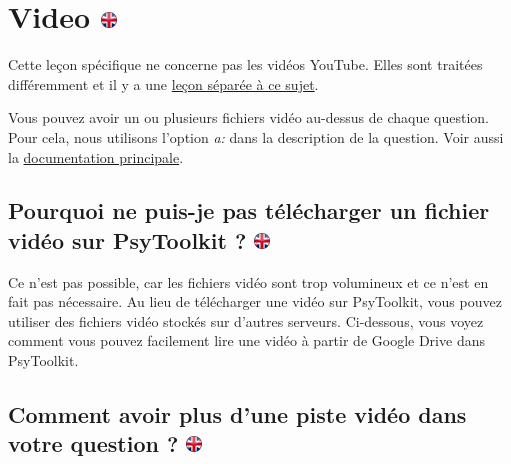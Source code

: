 \documentclass[
]{book}
\begin{document}
\hypertarget{video}{%
\section[Video ]{\texorpdfstring{Video
\href{https://www.psytoolkit.org/lessons/surveyaudiovideo.html\#_video}{\protect\includegraphics{img/ukflag.png}}}{Video }}\label{video}}

Cette leçon spécifique ne concerne pas les vidéos YouTube. Elles sont
traitées différemment et il y a une
\href{https://www.psytoolkit.org/lessons/youtube_video.html}{leçon
séparée à ce sujet}.

Vous pouvez avoir un ou plusieurs fichiers vidéo au-dessus de chaque
question. Pour cela, nous utilisons l'option \emph{a:} dans la
description de la question. Voir aussi la
\protect\hyperlink{s8}{documentation principale}.

\hypertarget{pourquoi-ne-puis-je-pas-tuxe9luxe9charger-un-fichier-viduxe9o-sur-psytoolkit}{%
\subsection[Pourquoi ne puis-je pas télécharger un fichier vidéo sur
PsyToolkit ? ]{\texorpdfstring{Pourquoi ne puis-je pas télécharger un
fichier vidéo sur PsyToolkit ?
\href{https://www.psytoolkit.org/lessons/surveyaudiovideo.html\#_why_can_i_not_upload_a_video_file_to_psytoolkit}{\protect\includegraphics{img/ukflag.png}}}{Pourquoi ne puis-je pas télécharger un fichier vidéo sur PsyToolkit ? }}\label{pourquoi-ne-puis-je-pas-tuxe9luxe9charger-un-fichier-viduxe9o-sur-psytoolkit}}

Ce n'est pas possible, car les fichiers vidéo sont trop volumineux et ce
n'est en fait pas nécessaire. Au lieu de télécharger une vidéo sur
PsyToolkit, vous pouvez utiliser des fichiers vidéo stockés sur d'autres
serveurs. Ci-dessous, vous voyez comment vous pouvez facilement lire une
vidéo à partir de Google Drive dans PsyToolkit.

\hypertarget{comment-avoir-plus-dune-piste-viduxe9o-dans-votre-question}{%
\subsection[Comment avoir plus d'une piste vidéo dans votre question ?
]{\texorpdfstring{Comment avoir plus d'une piste vidéo dans votre
question ?
\href{https://www.psytoolkit.org/lessons/surveyaudiovideo.html\#_how_to_have_more_than_one_audio_track_in_your_question}{\protect\includegraphics{img/ukflag.png}}}{Comment avoir plus d'une piste vidéo dans votre question ? }}\label{comment-avoir-plus-dune-piste-viduxe9o-dans-votre-question}}
\end{document}
